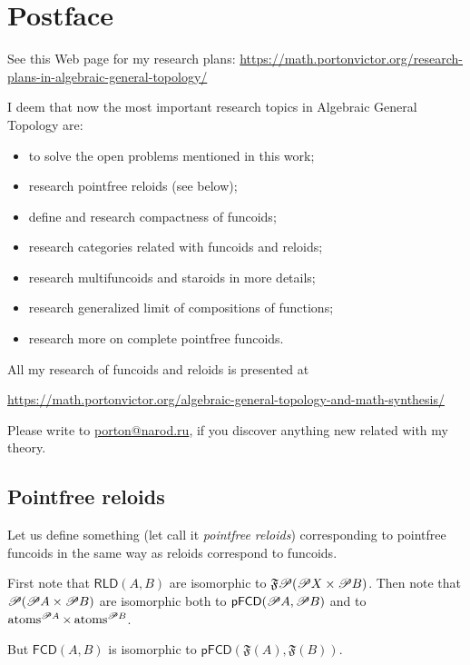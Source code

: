
\chapter{Postface}

See this Web page for my research plans: \href{https://math.portonvictor.org/research-plans-in-algebraic-general-topology/}{https://math.portonvictor.org/research-plans-in-algebraic-general-topology/}

I deem that now the most important research topics in Algebraic General
Topology are:
\begin{itemize}
\item to solve the open problems mentioned in this work;
\item research pointfree reloids (see below);
\item define and research compactness of funcoids;
\item research categories related with funcoids and reloids;
\item research multifuncoids and staroids in more details;
\item research generalized limit of compositions of functions;
\item research more on complete pointfree funcoids.
\end{itemize}
All my research of funcoids and reloids is presented at

\href{https://math.portonvictor.org/algebraic-general-topology-and-math-synthesis/}{https://math.portonvictor.org/algebraic-general-topology-and-math-synthesis/}

Please write to \href{mailto:porton@narod.ru}{porton@narod.ru}, if
you discover anything new related with my theory.


\section{Pointfree reloids}

Let us define something (let call it \emph{pointfree reloids}) corresponding
to pointfree funcoids in the same way as reloids correspond to funcoids.

First note that $\mathsf{RLD}(A,B)$ are isomorphic to $\mathfrak{F}\mathscr{P}(\mathscr{P} X\times\mathscr{P} B)$.
Then note that $\mathscr{P}(\mathscr{P} A\times\mathscr{P} B)$ are isomorphic
both to $\mathsf{pFCD}(\mathscr{P} A,\mathscr{P} B)$ and to $\operatorname{atoms}^{\mathscr{P} A}\times\operatorname{atoms}^{\mathscr{P} B}$.

But $\mathsf{FCD}(A,B)$ is isomorphic to $\mathsf{pFCD}(\mathfrak{F}(A),\mathfrak{F}(B))$.

